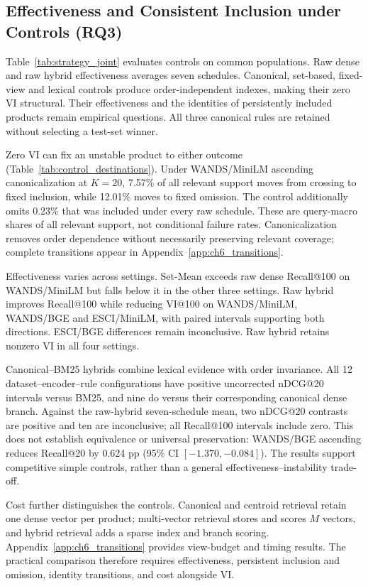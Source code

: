 \subsection{Effectiveness and Consistent Inclusion under Controls (RQ3)}
\label{sec:results_rq3}

Table~\ref{tab:strategy_joint} evaluates controls on common populations. Raw dense and raw hybrid effectiveness averages seven schedules. Canonical, set-based, fixed-view and lexical controls produce order-independent indexes, making their zero VI structural. Their effectiveness and the identities of persistently included products remain empirical questions. All three canonical rules are retained without selecting a test-set winner.



Zero VI can fix an unstable product to either outcome (Table~\ref{tab:control_destinations}). Under WANDS/MiniLM ascending canonicalization at $K=20$, 7.57\% of all relevant support moves from crossing to fixed inclusion, while 12.01\% moves to fixed omission. The control additionally omits 0.23\% that was included under every raw schedule. These are query-macro shares of all relevant support, not conditional failure rates. Canonicalization removes order dependence without necessarily preserving relevant coverage; complete transitions appear in Appendix~\ref{app:ch6_transitions}.



Effectiveness varies across settings. Set-Mean exceeds raw dense Recall@100 on WANDS/MiniLM but falls below it in the other three settings. Raw hybrid improves Recall@100 while reducing VI@100 on WANDS/MiniLM, WANDS/BGE and ESCI/MiniLM, with paired intervals supporting both directions. ESCI/BGE differences remain inconclusive. Raw hybrid retains nonzero VI in all four settings.

Canonical--BM25 hybrids combine lexical evidence with order invariance. All 12 dataset--encoder--rule configurations have positive uncorrected nDCG@20 intervals versus BM25, and nine do versus their corresponding canonical dense branch. Against the raw-hybrid seven-schedule mean, two nDCG@20 contrasts are positive and ten are inconclusive; all Recall@100 intervals include zero. This does not establish equivalence or universal preservation: WANDS/BGE ascending reduces Recall@20 by 0.624 pp (95\% CI $[-1.370,-0.084]$). The results support competitive simple controls, rather than a general effectiveness--instability trade-off.

Cost further distinguishes the controls. Canonical and centroid retrieval retain one dense vector per product; multi-vector retrieval stores and scores $M$ vectors, and hybrid retrieval adds a sparse index and branch scoring. Appendix~\ref{app:ch6_transitions} provides view-budget and timing results. The practical comparison therefore requires effectiveness, persistent inclusion and omission, identity transitions, and cost alongside VI.
